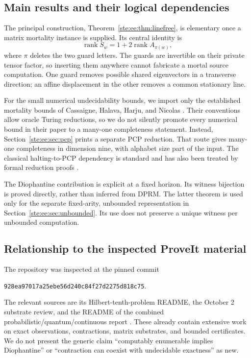 \documentclass[11pt,letterpaper]{article}
\theoremstyle{definition}
\theoremstyle{remark}
\newcommand{\rk}{\operatorname{rank}}
\newcommand{\repo}{\texttt{928ea97017a25ebe56d240c84f27d2275d818c75}}
\begin{document}
\subsection{Main results and their logical dependencies}

The principal construction, Theorem~\ref{ste:ee:thm:linefree}, is elementary once a matrix
mortality instance is supplied. Its central identity is
\begin{equation}
  \rk S_w=1+2\rk A_{\pi(w)},
  \label{ste:ee:eq:intro-rank}
\end{equation}
where $\pi$ deletes the two guard letters. The guards are invertible on their
private tensor factor, so inserting them anywhere cannot fabricate a mortal
source computation. One guard removes possible shared eigenvectors in a
transverse direction; an affine displacement in the other removes a common
stationary line.

For the small numerical undecidability bounds, we import only the established
mortality bounds of Cassaigne, Halava, Harju, and Nicolas \cite{cassaigne}.
Their conventions allow oracle Turing reductions, so we do not silently promote
every numerical bound in their paper to a many-one completeness statement.
Instead, Section~\ref{ste:ee:sec:pcp} prints a separate PCP reduction. That route gives
many-one completeness in dimension nine, with alphabet size part of the input.
The classical halting-to-PCP dependency is standard and has also been treated by
formal reduction proofs \cite{forster}.

The Diophantine contribution is explicit at a fixed horizon. Its witness
bijection is proved directly, rather than inferred from DPRM. The latter theorem
is used only for the separate fixed-arity, unbounded representation in
Section~\ref{ste:ee:sec:unbounded}. Its use does not preserve a unique witness per
unbounded computation.

\subsection{Relationship to the inspected ProveIt material}

The repository was inspected at the pinned commit
\begin{center}\small\repo.\end{center}
The relevant sources are its Hilbert-tenth-problem README, the October 2 substrate
review, and the README of the combined probabilistic/quantum/continuous report
\cite{repoH10,repoReview,repoProb}. These already contain extensive work on exact
observations, contractions, matrix substrates, and bounded certificates. We do
not present the generic claim ``computably enumerable implies Diophantine'' or
``contraction can coexist with undecidable exactness'' as new.
\end{document}
